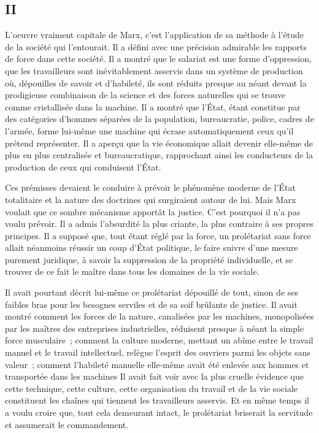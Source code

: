 \documentclass[french,twoside]{book} %
\begin{document}
\subsection[{II}]{II}
\noindent L'oeuvre vraiment capitale de Marx, c'est l'application de sa méthode à l'étude de la société qui l'entourait. Il a défini avec une précision admirable les rapports de force dans cette société. Il a montré que le salariat est une forme d'oppression, que les travailleurs sont inévitablement asservis dans un système de production où, dépouilles de savoir et d'habileté, ils sont réduits presque au néant devant la prodigieuse combinaison de la science et des forces naturelles qui se trouve comme cristallisée dans la machine. Il a montré que l'État, étant constitue par des catégories d'hommes séparées de la population, bureaucratie, police, cadres de l'armée, forme lui-même une machine qui écrase automatiquement ceux qu'il prétend représenter. Il a aperçu que la vie économique allait devenir elle-même de plus en plus centralisée et bureaucratique, rapprochant ainsi les conducteurs de la production de ceux qui conduisent l'État.\par
Ces prémisses devaient le conduire à prévoir le phénomène moderne de l'État totalitaire et la nature des doctrines qui surgiraient autour de lui. Mais Marx voulait que ce sombre mécanisme apportât la justice. C'est pourquoi il n'a pas voulu prévoir. Il a admis l'absurdité la plus criante, la plus contraire à ses propres principes. Il a supposé que, tout étant réglé par la force, un prolétariat sans force allait néanmoins réussir un coup d'État politique, le faire suivre d'une mesure purement juridique, à savoir la suppression de la propriété individuelle, et se trouver de ce fait le maître dans tous les domaines de la vie sociale.\par
Il avait pourtant décrit lui-même ce prolétariat dépouillé de tout, sinon de ses faibles bras pour les besognes serviles et de sa soif brûlante de justice. Il avait montré comment les forces de la nature, canalisées par les machines, monopolisées par les maîtres des entreprises industrielles, réduisent presque à néant la simple force musculaire ; comment la culture moderne, mettant un abîme entre le travail manuel et le travail intellectuel, relègue l'esprit des ouvriers parmi les objets sans valeur ; comment l'habileté manuelle elle-même avait été enlevée aux hommes et transportée dans les machines Il avait fait voir avec la plus cruelle évidence que cette technique, cette culture, cette organisation du travail et de la vie sociale constituent les chaînes qui tiennent les travailleurs asservis. Et en même temps il a voulu croire que, tout cela demeurant intact, le prolétariat briserait la servitude et assumerait le commandement.\par
\end{document}
